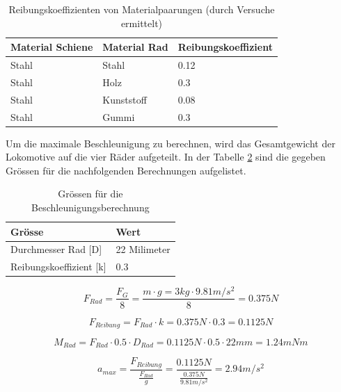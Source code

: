 \documentclass[../../main.tex]{subfiles}
\begin{document}
    \begin{table}[H] \centering
        \begin{tabular}{|l|l|l|}
        \hline
        \textbf{Material Schiene} & \textbf{Material Rad} & \textbf{Reibungskoeffizient}\\
        \hline
        Stahl                                & Stahl        & 0.12\\
        \hline
        Stahl                                & Holz         & 0.3\\
        \hline
        Stahl                                & Kunststoff   & 0.08\\
        \hline
        Stahl                                & Gummi        & 0.3\\
        \hline
        \end{tabular}

        \caption{Reibungskoeffizienten von Materialpaarungen (durch Versuche ermittelt)}
        \label{tab:reibungskoeffizient}
        \end{table}

    Um die maximale Beschleunigung zu berechnen, wird das Gesamtgewicht der Lokomotive auf die vier Räder aufgeteilt. In der Tabelle \ref{tab:groessen_beschleunigung} sind die gegeben Grössen für die nachfolgenden Berechnungen aufgelistet.\\

    \begin{table}[H] \centering
        \begin{tabular}{|l|l|}
        \hline
        \textbf{Grösse} & \textbf{Wert}\\
        \hline
        Durchmesser Rad [D]          & 22 Milimeter\\
         \hline
        Reibungskoeffizient [k]      & 0.3\\
        \hline
        \end{tabular}

        \caption{Grössen für die Beschleunigungsberechnung}
        \label{tab:groessen_beschleunigung}
        \end{table}

    $$F_{Rad}=\frac{F_{G}}{8}=\frac{m \cdot g=3kg \cdot 9.81m/s^2}{8}=0.375N$$

    $$F_{Reibung}=F_{Rad} \cdot k=0.375N \cdot 0.3=0.1125N$$

    $$M_{Rad}=F_{Rad} \cdot 0.5 \cdot D_{Rad}= 0.1125N \cdot 0.5 \cdot 22mm = 1.24mNm$$

    $$a_{max}=\frac{F_{Reibung}}{\frac{F_{Rad}}{g}}=\frac{0.1125N}{\frac{0.375N}{9.81m/s^2}}=2.94m/s^2$$
    \\
\end{document}

